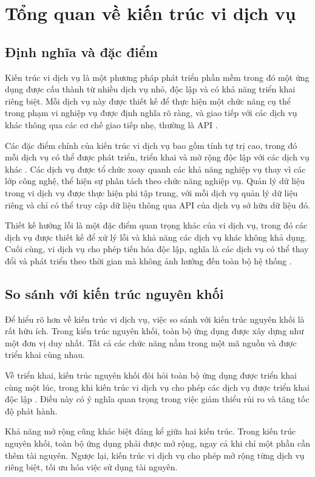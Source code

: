 \section{Tổng quan về kiến trúc vi dịch vụ}

\subsection{Định nghĩa và đặc điểm}
Kiến trúc vi dịch vụ là một phương pháp phát triển phần mềm trong đó một ứng
dụng được cấu thành từ nhiều dịch vụ nhỏ, độc lập và có khả năng triển khai
riêng biệt. Mỗi dịch vụ này được thiết kế để thực hiện một chức năng cụ thể
trong phạm vi nghiệp vụ được định nghĩa rõ ràng, và giao tiếp với các dịch vụ
khác thông qua các cơ chế giao tiếp nhẹ, thường là API \cite{fowler2014}.

Các đặc điểm chính của kiến trúc vi dịch vụ bao gồm tính tự trị cao, trong đó mỗi dịch vụ có thể được phát triển, triển khai và mở rộng độc lập với các dịch vụ khác \cite{newman2015}. Các dịch vụ được tổ chức xoay quanh các khả năng
nghiệp vụ thay vì các lớp công nghệ, thể hiện sự phân tách theo chức năng
nghiệp vụ. Quản lý dữ liệu trong vi dịch vụ được thực hiện phi tập trung, với
mỗi dịch vụ quản lý dữ liệu riêng và chỉ có thể truy cập dữ liệu thông qua API
của dịch vụ sở hữu dữ liệu đó.

Thiết kế hướng lỗi là một đặc điểm quan trọng khác của vi dịch vụ, trong đó
các dịch vụ được thiết kế để xử lý lỗi và khả năng các dịch vụ khác không khả
dụng. Cuối cùng, vi dịch vụ cho phép tiến hóa độc lập, nghĩa là các dịch vụ
có thể thay đổi và phát triển theo thời gian mà không ảnh hưởng đến toàn bộ hệ
thống \cite{richardson2019}.

\subsection{So sánh với kiến trúc nguyên khối}
Để hiểu rõ hơn về kiến trúc vi dịch vụ, việc so sánh với kiến trúc nguyên khối là rất hữu ích. Trong kiến trúc nguyên khối, toàn bộ ứng dụng được xây dựng như một đơn vị duy nhất. Tất cả các chức năng nằm trong một mã nguồn và được triển khai cùng nhau.

Về triển khai, kiến trúc nguyên khối đòi hỏi toàn bộ ứng dụng được triển khai
cùng một lúc, trong khi kiến trúc vi dịch vụ cho phép các dịch vụ được triển
khai độc lập \cite{newman2015}. Điều này có ý nghĩa quan trọng trong việc giảm thiểu rủi ro và tăng tốc độ phát hành.

Khả năng mở rộng cũng khác biệt đáng kể giữa hai kiến trúc. Trong kiến trúc
nguyên khối, toàn bộ ứng dụng phải được mở rộng, ngay cả khi chỉ một phần cần
thêm tài nguyên. Ngược lại, kiến trúc vi dịch vụ cho phép mở rộng từng dịch
vụ riêng biệt, tối ưu hóa việc sử dụng tài nguyên.

